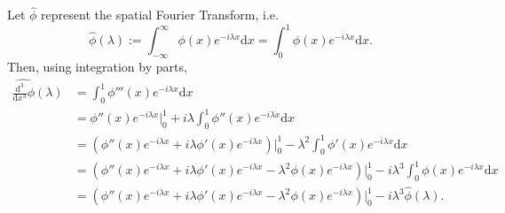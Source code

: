 Let $\hat{\phi}$ represent the spatial Fourier Transform, i.e.
$$\widehat{\phi}(\lambda) := \int_{-\infty}^{\infty} \phi(x) e^{-i\lambda x} \mathrm{d}x = \int_{0}^{1} \phi(x) e^{-i\lambda x} \mathrm{d}x.$$
Then, using integration by parts,
\begin{align*}
    \widehat{\frac{\mathrm{d}^3}{\mathrm{d}x^3}\phi}(\lambda) &= \int_{0}^{1} \phi'''(x) e^{-i\lambda x} \mathrm{d}x \\
    &= \phi''(x) e^{-i\lambda x}\bigg\rvert_0^1 + i\lambda\int_{0}^{1} \phi''(x) e^{-i\lambda x} \mathrm{d}x \\
    &= \left(\phi''(x) e^{-i\lambda x} + i\lambda \phi'(x) e^{-i\lambda x} \right)\bigg\rvert_0^1 - \lambda^2\int_{0}^{1} \phi'(x) e^{-i\lambda x} \mathrm{d}x \\
    &= \left(\phi''(x) e^{-i\lambda x} + i\lambda \phi'(x) e^{-i\lambda x} - \lambda^2 \phi(x) e^{-i\lambda x}\right) \bigg\rvert_0^1 - i\lambda^3\int_{0}^{1} \phi(x) e^{-i\lambda x} \mathrm{d}x \\
    &= \left(\phi''(x) e^{-i\lambda x} + i\lambda \phi'(x) e^{-i\lambda x} - \lambda^2 \phi(x) e^{-i\lambda x}\right) \bigg\rvert_0^1 - i\lambda^3\widehat\phi(\lambda). \\
\end{align*}